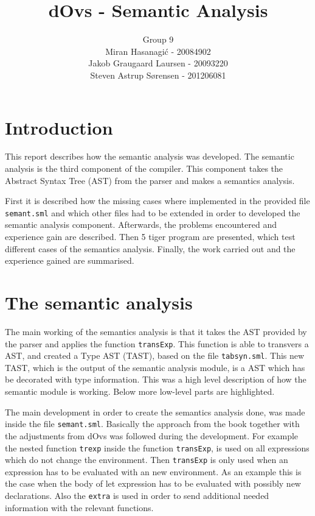 \documentclass{article}
\title{dOvs - Semantic Analysis}
\author{
  Group 9 \\
  Miran Hasanagi\'{c} - 20084902 \\
  Jakob Graugaard Laursen - 20093220\\
  Steven Astrup S\o rensen - 201206081
}
\begin{document}
\maketitle

\section{Introduction}
This report describes how the semantic analysis was developed. The semantic analysis is the third component of the compiler. This component takes the Abstract Syntax Tree (AST) from the parser and makes a semantics analysis. 

First it is described how the missing cases where implemented in the provided file \texttt{semant.sml} and which other files had to be extended in order to developed the semantic analysis component. Afterwards, the problems encountered and experience gain are described. Then 5 tiger program are presented, which test different cases of the semantics analysis. Finally, the work carried out and the experience gained are summarised. 

\section{The semantic analysis}
The main working of the semantics analysis is that it takes the AST provided by the parser and applies the function \texttt{transExp}. This function is able to transvers a AST, and created a Type AST (TAST), based on the file \texttt{tabsyn.sml}. This new TAST, which is the output of the semantic analysis module, is a AST which has be decorated with type information. This was a high level description of how the semantic module is working. Below more low-level parts are highlighted.

The main development in order to create the semantics analysis done, was made inside the file \texttt{semant.sml}. Basically the approach from the book together with the adjustments from dOvs was followed during the development. For example the nested function \texttt{trexp} inside the function \texttt{transExp}, is used on all expressions which do not change the environment. Then \texttt{transExp} is only used when an expression has to be evaluated with an new environment. As an example this is the case when the body of let expression has to be evaluated with possibly new declarations. Also the \texttt{extra} is used in order to send additional needed information with the relevant functions.
\end{document}
